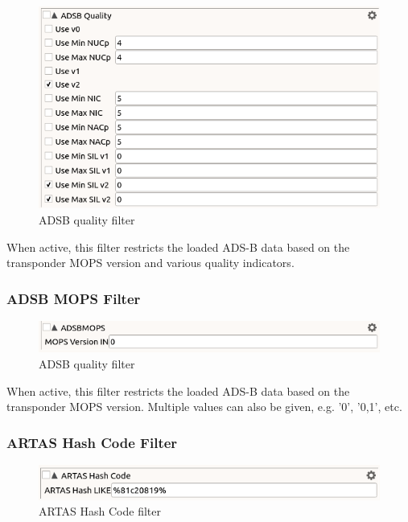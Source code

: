 \begin{figure}[H]
  \center
    \includegraphics[width=12cm,frame]{figures/filter_adsb_quality.png}
  \caption{ADSB quality filter}
\end{figure}

When active, this filter restricts the loaded ADS-B data based on the transponder MOPS version and various quality indicators. 

\subsubsection{ADSB MOPS Filter}

\begin{figure}[H]
  \center
    \includegraphics[width=12cm,frame]{figures/filter_adsb_mops.png}
  \caption{ADSB quality filter}
\end{figure}

When active, this filter restricts the loaded ADS-B data based on the transponder MOPS version. Multiple values can also be given, e.g. '0', '0,1', etc. 

\subsubsection{ARTAS Hash Code Filter}

\begin{figure}[H]
  \center
    \includegraphics[width=12cm,frame]{figures/filter_hashcode.png}
  \caption{ARTAS Hash Code filter}
\end{figure}

